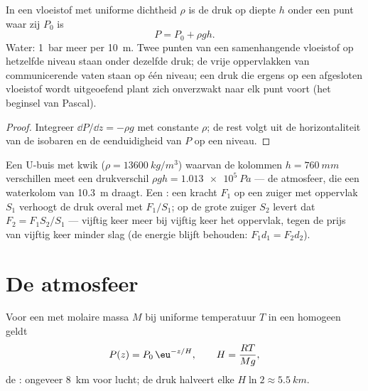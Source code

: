 \begin{corollary}\label{cor:b1:fluid-statics:incompressible}
In een vloeistof met uniforme dichtheid $\rho$ is de druk op diepte $h$ onder een
punt waar zij $P_0$ is
\[
P = P_0 + \rho gh .
\]
Water: \qty{1}{bar} meer per \qty{10}{m}. Twee punten van een samenhangende
vloeistof op hetzelfde niveau staan onder dezelfde druk; de vrije oppervlakken van
communicerende vaten staan op één niveau; een druk die ergens op een
afgesloten vloeistof wordt uitgeoefend plant zich onverzwakt naar elk punt voort
(het beginsel van Pascal).
\end{corollary}

\begin{proof}
Integreer $\dd P/\dd z = -\rho g$ met constante $\rho$; de rest volgt uit de
horizontaliteit van de isobaren en de eenduidigheid van $P$ op een niveau.
\end{proof}

\begin{example}\label{ex:b1:fluid-statics:manometer}
Een U-buis met kwik ($\rho = \qty{13600}{kg/m^3}$) waarvan de kolommen
$h = \qty{760}{mm}$ verschillen meet een drukverschil $\rho gh = \qty{1.013e5}{Pa}$
--- de atmosfeer, die een waterkolom van \qty{10.3}{m} draagt. Een
: een kracht $F_1$ op een zuiger met oppervlak $S_1$ verhoogt de
druk overal met $F_1/S_1$; op de grote zuiger $S_2$ levert dat
$F_2 = F_1S_2/S_1$ --- vijftig keer meer bij vijftig keer het oppervlak, tegen de
prijs van vijftig keer minder slag (de energie blijft behouden: $F_1d_1 = F_2d_2$).
\end{example}

\section{De atmosfeer}

\begin{proposition}\label{prop:b1:fluid-statics:atmosphere}
Voor een  met molaire massa $M$ bij uniforme temperatuur $T$ in een
homogeen  geldt
\[
P(z) = P_0\,\eu^{-z/H}, \qquad H = \frac{RT}{Mg} ,
\]
de \emph{}: ongeveer \qty{8}{km} voor lucht; de druk halveert
elke $H\ln2 \approx \qty{5.5}{km}$.
\end{proposition}

